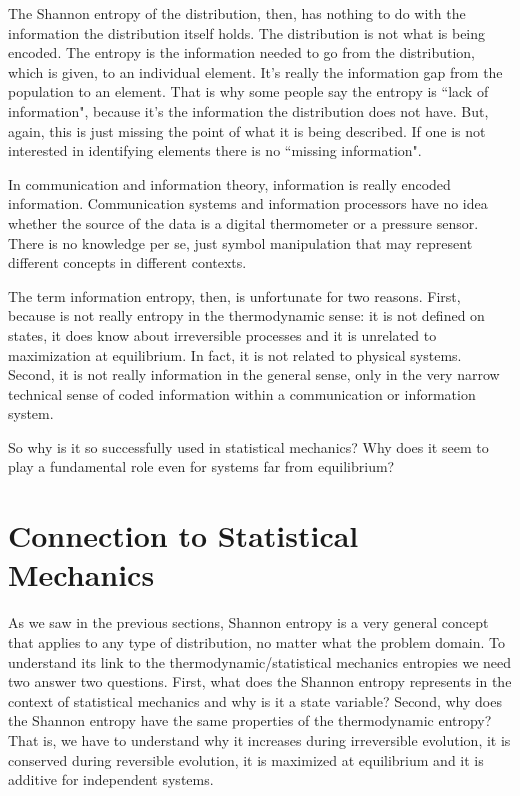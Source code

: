 \documentclass{article}
\begin{document}
The Shannon entropy of the distribution, then, has nothing to do with the information the distribution itself holds. The distribution is not what is being encoded. The entropy is the information needed to go from the distribution, which is given, to an individual element. It's really the information gap from the population to an element. That is why some people say the entropy is ``lack of information", because it's the information the distribution does not have. But, again, this is just missing the point of what it is being described. If one is not interested in identifying elements there is no ``missing information".

In communication and information theory, information is really encoded information. Communication systems and information processors have no idea whether the source of the data is a digital thermometer or a pressure sensor. There is no knowledge per se, just symbol manipulation that may represent different concepts in different contexts.

The term information entropy, then, is unfortunate for two reasons. First, because is not really entropy in the thermodynamic sense: it is not defined on states, it does know about irreversible processes and it is unrelated to maximization at equilibrium. In fact, it is not related to physical systems. Second, it is not really information in the general sense, only in the very narrow technical sense of coded information within a communication or information system.

So why is it so successfully used in statistical mechanics? Why does it seem to play a fundamental role even for systems far from equilibrium?

\section{Connection to Statistical Mechanics\label{csm}}

As we saw in the previous sections, Shannon entropy is a very general concept that applies to any type of distribution, no matter what the problem domain. To understand its link to the thermodynamic/statistical mechanics entropies we need two answer two questions. First, what does the Shannon entropy represents in the context of statistical mechanics and why is it a state variable? Second, why does the Shannon entropy have the same properties of the thermodynamic entropy? That is, we have to understand why it increases during irreversible evolution, it is conserved during reversible evolution, it is maximized at equilibrium and it is additive for independent systems.
\end{document}
